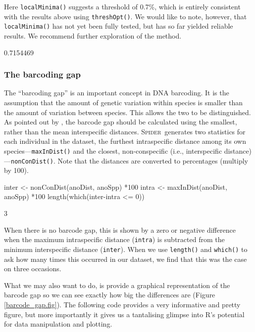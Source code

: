 \documentclass{article}
\newcommand{\Spider}{\textsc{Spider}} %
\newcommand{\fun}[1]{\texttt{#1}}
\begin{document}
Here \fun{localMinima()} suggests a threshold of 0.7\%, which is entirely consistent with the results above using \fun{threshOpt()}. We would like to note, however, that \fun{localMinima()} has not yet been fully tested, but has so far yielded reliable results. We recommend further exploration of the method.


\begin{Routput}
[1] 0.7154469
\end{Routput}


\subsubsection{The barcoding gap}

The ``barcoding gap'' \citep{Meye.Paul.2005} is an important concept in DNA barcoding. It is the assumption that the amount of genetic variation within species is smaller than the amount of variation between species. This allows the two to be distinguished. As pointed out by \citet{Meier2008}, the barcode gap should be calculated using the smallest, rather than the mean interspecific distances. \Spider~generates two statistics for each individual in the dataset, the furthest intraspecific distance among its own species---\fun{maxInDist()} and the closest, non-conspecific (i.e., interspecific distance)---\fun{nonConDist()}. Note that the distances are converted to percentages (multiply by 100).

\begin{console}
inter <- nonConDist(anoDist, anoSpp) *100
intra <- maxInDist(anoDist, anoSpp) *100
length(which(inter-intra <= 0))
\end{console}

\begin{Routput}
[1] 3
\end{Routput}

When there is no barcode gap, this is shown by a zero or negative difference when the maximum intraspecific distance (\fun{intra}) is subtracted from the minimum interspecific distance (\fun{inter}). When we use \fun{length()} and \fun{which()} to ask how many times this occurred in our dataset, we find that this was the case on three occasions.

What we may also want to do, is provide a graphical representation of the barcode gap so we can see exactly how big the differences are (Figure \ref{barcode_gap.fig}). The following code provides a very informative and pretty figure, but more importantly it gives us a tantalising glimpse into R's potential for data manipulation and plotting. 
\end{document}
